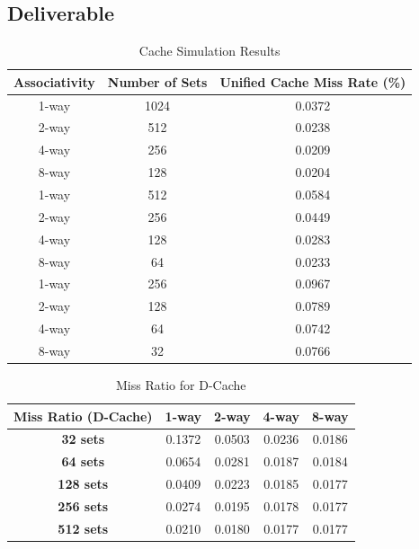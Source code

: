 \documentclass{article}
\begin{document}
\subsection{Deliverable}
\begin{table}[h!]
	\centering
	\begin{tabular}{ccc}
		\toprule
		\textbf{Associativity} & \textbf{Number of Sets} & \textbf{Unified Cache Miss Rate (\%)} \\
		\midrule
		1-way  & 1024 &  0.0372  \\
		2-way  & 512  &   0.0238 \\
		4-way  & 256  &  0.0209  \\
		8-way  & 128  &   0.0204 \\
		\midrule
		1-way  & 512  &   0.0584 \\
		2-way  & 256  &   0.0449 \\
		4-way  & 128  &   0.0283 \\
		8-way  & 64   &   0.0233 \\
		\midrule
		1-way  & 256  &    0.0967\\
		2-way  & 128  &    0.0789\\
		4-way  & 64   &    0.0742\\
		8-way  & 32   &    0.0766\\
		\bottomrule
	\end{tabular}
	\caption{Cache Simulation Results}
\end{table}
\begin{table}[h]
	\centering
	\begin{tabular}{|c|c|c|c|c|}
		\hline
		\textbf{Miss Ratio (D-Cache)} & \textbf{1-way} & \textbf{2-way} & \textbf{4-way} & \textbf{8-way} \\ \hline
		\textbf{32 sets}  &       0.1372    &     0.0503       &        0.0236      &     0.0186        \\ \hline
		\textbf{64 sets}  &      0.0654       &      0.0281       &     0.0187       &       0.0184      \\ \hline
		\textbf{128 sets} &      0.0409       &       0.0223      &      0.0185       &      0.0177       \\ \hline
		\textbf{256 sets} &       0.0274      &      0.0195       &      0.0178       &      0.0177        \\ \hline
		\textbf{512 sets} &      0.0210       &      0.0180       &      0.0177       &     0.0177        \\ \hline
	\end{tabular}
	\caption{Miss Ratio for D-Cache}
	\label{tab:D1-Cache}
\end{table}
\end{document}

